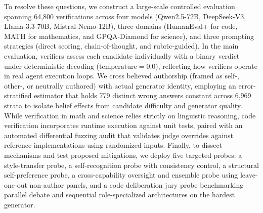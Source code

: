 To resolve these questions, we construct a large-scale controlled evaluation spanning 64,800 verifications across four models (Qwen2.5-72B, DeepSeek-V3, Llama-3.3-70B, Mistral-Nemo-12B), three domains (HumanEval+ for code, MATH for mathematics, and GPQA-Diamond for science), and three prompting strategies (direct scoring, chain-of-thought, and rubric-guided). In the main evaluation, verifiers assess each candidate individually with a binary verdict under deterministic decoding ($\text{temperature} = 0.0$), reflecting how verifiers operate in real agent execution loops. We cross believed authorship (framed as self-, other-, or neutrally authored) with actual generator identity, employing an error-stratified estimator that holds 779 distinct wrong answers constant across 6,969 strata to isolate belief effects from candidate difficulty and generator quality. While verification in math and science relies strictly on linguistic reasoning, code verification incorporates runtime execution against unit tests, paired with an automated differential fuzzing audit that validates judge overrides against reference implementations using randomized inputs. Finally, to dissect mechanisms and test proposed mitigations, we deploy five targeted probes: a style-transfer probe, a self-recognition probe with consistency control, a structural self-preference probe, a cross-capability oversight and ensemble probe using leave-one-out non-author panels, and a code deliberation jury probe benchmarking parallel debate and sequential role-specialized architectures on the hardest generator.

